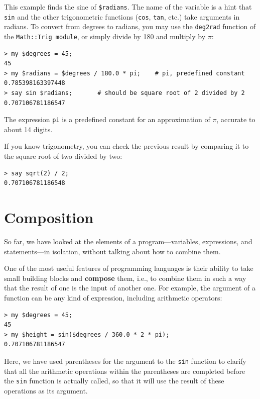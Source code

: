 This example finds the sine of \verb'$radians'.  The name of the
variable is a hint that {\tt sin} and the other trigonometric
functions ({\tt cos}, {\tt tan}, etc.)  take arguments 
in radians. To convert from degrees to radians, you may 
use the  \verb'deg2rad' function of the 
\verb'Math::Trig module', or simply divide by 180 
and multiply by $\pi$:

\begin{verbatim}
> my $degrees = 45;
45
> my $radians = $degrees / 180.0 * pi;    # pi, predefined constant
0.785398163397448
> say sin $radians;       # should be square root of 2 divided by 2
0.707106781186547
\end{verbatim}
%
The expression {\tt pi} is a predefined constant for an
approximation of $\pi$, accurate to about 14 digits.

If you know
trigonometry, you can check the previous result by comparing it to
the square root of two divided by two:

\begin{verbatim}
> say sqrt(2) / 2;
0.707106781186548
\end{verbatim}
%

\section{Composition}

So far, we have looked at the elements of a program---variables,
expressions, and statements---in isolation, without talking about how to combine them.

One of the most useful features of programming languages is their
ability to take small building blocks and {\bf compose} them, i.e., 
to combine them in such a way that the result of one is the 
input of another one.  For example, the argument of a function 
can be any kind of expression, including arithmetic operators:

\begin{verbatim}
> my $degrees = 45;
45
> my $height = sin($degrees / 360.0 * 2 * pi);
0.707106781186547
\end{verbatim}
%
Here, we have used parentheses for the argument to the {\tt sin} 
function to clarify that all the arithmetic operations 
within the parentheses are completed before the {\tt sin} function 
is actually called, so that it will use the result of these operations 
as its argument. 

